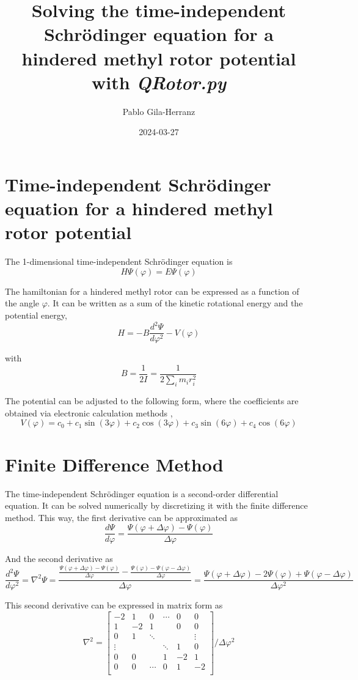 \documentclass[12pt,a4paper]{article}
\title{Solving the time-independent Schrödinger equation for a hindered methyl rotor potential with \textit{QRotor.py}}
\author{Pablo Gila-Herranz}
\date{2024-03-27}
\begin{document}
\maketitle


\section*{Time-independent Schrödinger equation for a hindered methyl rotor potential}

The 1-dimensional time-independent Schrödinger equation is
$$
H\Psi(\varphi)=E\Psi(\varphi)
$$

The hamiltonian for a hindered methyl rotor can be expressed as a function of the angle $\varphi$.
It can be written as a sum of the kinetic rotational energy and the potential energy,
$$
H = -B \frac{d^2\Psi}{d\varphi^2} - V(\varphi)
$$

with
$$
B = \frac{1}{2I}=\frac{1}{2\sum_{i}m_{i}r_{i}^{2}}
$$

The potential can be adjusted to the following form, where the coefficients are obtained via electronic calculation methods \cite{titov2023},
$$
V(\varphi)=c_{0}+c_{1}\sin(3\varphi)+c_{2}\cos(3\varphi)+c_{3}\sin(6\varphi)+c_{4}\cos(6\varphi)
$$


\section*{Finite Difference Method}

The time-independent Schrödinger equation is a second-order differential equation.
It can be solved numerically by discretizing it with the finite difference method.
This way, the first derivative can be approximated as
$$
\frac{d\Psi}{d\varphi} = \frac{\Psi(\varphi+\Delta\varphi)-\Psi(\varphi)}{\Delta\varphi}
$$

And the second derivative as
$$
\frac{d^2\Psi}{d\varphi^2} = \nabla^2\Psi = \frac{\frac{\Psi(\varphi+\Delta\varphi)-\Psi(\varphi)}{\Delta\varphi} - \frac{\Psi(\varphi)-\Psi(\varphi-\Delta\varphi)}{\Delta\varphi}}{\Delta\varphi} = \frac{\Psi(\varphi+\Delta\varphi)-2\Psi(\varphi)+\Psi(\varphi-\Delta\varphi)}{\Delta\varphi^2}
$$

This second derivative can be expressed in matrix form as
\[
    \nabla^2 =
    \left[ {\begin{array}{cccccc}
    -2      &  1     &  0     & \cdots &  0    &  0      \\
     1      & -2     &  1     &        &  0    &  0      \\
     0      &  1     & \ddots &        &       &  \vdots \\
     \vdots &        &        & \ddots &  1    &  0      \\
     0      &  0     &        &  1     & -2    &  1      \\
     0      &  0     & \cdots &  0     &  1    & -2      \\
    \end{array} } \right] / \Delta\varphi^2
\]
\end{document}
